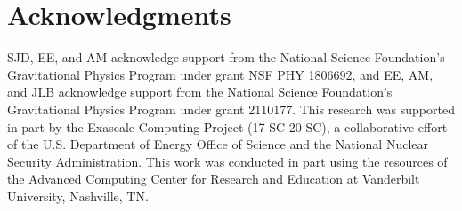 \section{Acknowledgments}
SJD, EE, and AM acknowledge support from the National Science Foundation’s
Gravitational Physics Program under grant NSF PHY 1806692, and EE, AM, and JLB
acknowledge support from the National Science Foundation’s Gravitational
Physics Program under grant 2110177.
This research was supported in part by the Exascale Computing Project
(17-SC-20-SC), a collaborative effort of the U.S. Department of Energy Office
of Science and the National Nuclear Security Administration.
This work was conducted in part using
the resources of the Advanced Computing Center for Research and Education at
Vanderbilt University, Nashville, TN.


